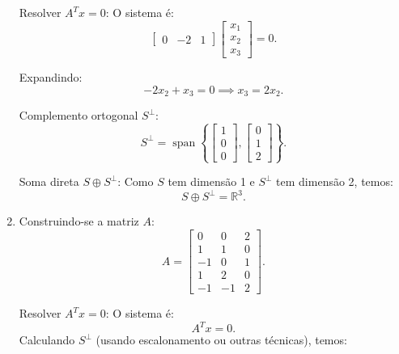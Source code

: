\begin{resolution}
\begin{enumerate}[label=\alph*)]
          Resolver \( A^T x = 0 \):
          O sistema é:
          \[
            \begin{bmatrix}
              0 & -2 & 1
            \end{bmatrix}
            \begin{bmatrix}
              x_1 \\
              x_2 \\
              x_3
            \end{bmatrix}
            = 0.
          \]

          Expandindo:
          \[
            -2x_2 + x_3 = 0 \implies x_3 = 2x_2.
          \]

          Complemento ortogonal \( S^\perp \):
          \[
            S^\perp = \operatorname{span}\left\{
            \begin{bmatrix}
              1 \\ 0 \\ 0
            \end{bmatrix},
            \begin{bmatrix}
              0 \\ 1 \\ 2
            \end{bmatrix}
            \right\}.
          \]

          Soma direta \( S \oplus S^\perp \):
          Como \( S \) tem dimensão 1 e \( S^\perp \) tem dimensão 2, temos:
          \[
            S \oplus S^\perp = \mathbb{R}^3.
          \]

    \item Construindo-se a matriz \( A \):
          \[
            A = \begin{bmatrix}
              0  & 0  & 2 \\
              1  & 1  & 0 \\
              -1 & 0  & 1 \\
              1  & 2  & 0 \\
              -1 & -1 & 2
            \end{bmatrix}.
          \]

          Resolver \( A^T x = 0 \):
          O sistema é:
          \[
            A^T x = 0.
          \]
          Calculando \( S^\perp \) (usando escalonamento ou outras técnicas), temos:


\end{enumerate}
\end{resolution}
